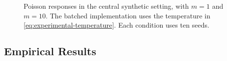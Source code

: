 \documentclass[10pt,twoside,letterpaper]{article}
\begin{document}
\clearpage
\begin{figure}[H]
  \centering
  \hfill
  \par\vspace{2pt}
  \hfill
  \caption{Poisson responses in the central synthetic setting, with $m=1$ and $m=10$. The batched implementation uses the temperature in \eqref{eq:experimental-temperature}. Each condition uses ten seeds.}
  \label{fig:synthetic-poisson}
\end{figure}
\clearpage
\subsection{Empirical Results}
\label{app:empirical-results}
\end{document}
